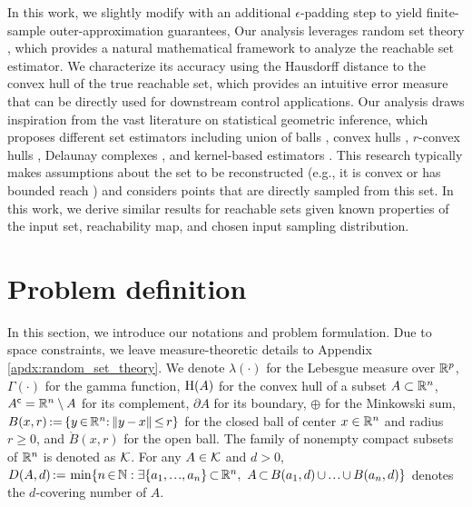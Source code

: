 \documentclass[12pt]{l4dc2022} %
\begin{document}
% 
In this work, we slightly modify \randup \citep{LewPavone2020} with an additional $\epsilon$-padding step to yield finite-sample outer-approximation guarantees,  %
% 
% 
% 
% 
Our analysis leverages  
random set theory \citep{Matheron1975,Molchanov_BookTheoryOfRandomSets2017}, which provides a natural mathematical framework to analyze the reachable set estimator. %
We characterize its accuracy using the Hausdorff distance to the convex hull of the true reachable set, which provides an intuitive error measure %
that can be directly used for downstream control applications. 
% 
% 
% 
Our analysis draws inspiration from the vast literature on statistical geometric inference, which proposes different %
set estimators including  
union of balls \citep{Devroye1980,Baillo2001}, 
convex hulls \citep{RipleyPoissonForest1977,Schneider1988,Dumbgen1996}, 
$r$-convex hulls \citep{Rodriguez2016,RodriguezCasal2019,AriasCastro2019},
Delaunay complexes \citep{Boissonnat2013,AamariPhD2017,Aamari2018}, 
and kernel-based estimators \citep{DeVito2014,Rudi2017}. 
% 
% 
% 
% 
% 
% 
% 
% 
% 
% 
% 
% 
% 
% 
% 
% 
% 
% 
% 
% 
This research typically makes assumptions about the set to be reconstructed %
(e.g., %
it is convex \citep{Dumbgen1996} or has bounded reach \citep{Cuevas2009}) and considers points that are directly sampled from this set. 
In this work, we derive similar results for reachable sets 
given known properties of the 
input set,  
reachability map, and 
chosen input sampling distribution. 


\vspace{-1mm}
\section{Problem definition}\label{sec:formal_setting}
\vspace{-1mm}
In this section, we introduce our notations and  problem formulation. %
Due to space constraints, we leave measure-theoretic details to Appendix \ref{apdx:random_set_theory}.  
% 
We denote 
% 
$\lambda(\cdot)$ for the Lebesgue measure over $\mathbb{R}^p$, 
$\Gamma(\cdot)$ for the %
gamma function, 
$\textrm{H}(A)$ for the convex hull of a subset $A\subset\mathbb{R}^n$, $A^{\mathsf{c}}=\mathbb{R}^n\setminus A$ for its complement, 
$\partial A$ for its boundary, 
$\oplus$ for the Minkowski sum, 
$B(x,r)\,{:=}\,\{y\,{\in}\,\mathbb{R}^n{:}\, 
 \|y\,{-}\,x\|\,{\leq}\, r
\}$ for the closed ball of center $x\in\mathbb{R}^n$ and radius $r\geq 0$, 
and $\mathring{B}(x,r)$ for the open ball. 
% 
% 
% 
The family of nonempty compact subsets of $\mathbb{R}^n$ is denoted as $\mathcal{K}$.  
% 
For any $A\in\mathcal{K}$ and $d>0$, $D(A, d)\,{:=}\,\min\{n\,{\in}\,\mathbb{N} : 
\exists \{a_1,{\mydots},a_n\}\,{\subset}\,\R^n, \ 
A\,{\subset}\, B(a_1,d)\,{\cup}\,{\mydots}\,{\cup}\, B(a_n,d)
\}$ denotes the $d$-covering number of $A$. 
% 
\end{document}
